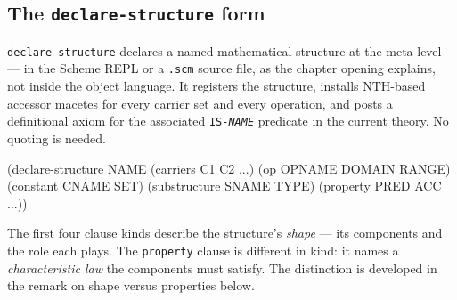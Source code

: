 \subsection{The \texttt{declare-structure} form}

\texttt{declare-structure} declares a named mathematical structure at the
meta-level --- in the Scheme REPL or a \texttt{.scm} source file, as the
chapter opening explains, not inside the object language.  It registers
the structure, installs NTH-based accessor
macetes for every carrier set and every operation, and posts a
definitional axiom for the associated \texttt{IS-\textit{NAME}} predicate
in the current theory.  No quoting is needed.

\begin{VNBcode}
(declare-structure NAME
  (carriers C1 C2 ...)
  (op OPNAME DOMAIN RANGE)
  (constant CNAME SET)
  (substructure SNAME TYPE)
  (property PRED ACC ...))
\end{VNBcode}

The first four clause kinds describe the structure's \emph{shape} --- its
components and the role each plays.  The \texttt{property} clause is different in
kind: it names a \emph{characteristic law} the components must satisfy.  The
distinction is developed in the remark on shape versus properties below.

